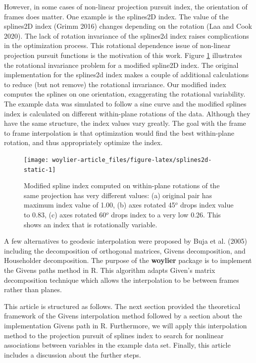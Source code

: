 However, in some cases of non-linear projection pursuit index, the orientation of frames does matter. One example is the splines2D index. The value of the splines2D index (Grimm 2016) changes depending on the rotation (Laa and Cook 2020). The lack of rotation invariance of the splines2d index raises complications in the optimization process. This rotational dependence issue of non-linear projection pursuit functions is the motivation of this work. Figure \ref{fig:splines2d-static} illustrates the rotational invariance problem for a modified spline2D index. The original implementation for the splines2d index makes a couple of additional calculations to reduce (but not remove) the rotational invariance. Our modified index computes the splines on one orientation, exaggerating the rotational variability. The example data was simulated to follow a sine curve and the modified splines index is calculated on different within-plane rotations of the data. Although they have the same structure, the index values vary greatly. The goal with the frame to frame interpolation is that optimization would find the best within-plane rotation, and thus appropriately optimize the index.

\begin{figure}
\texttt{[image: woylier-article\_files/figure-latex/splines2d-static-1]} \caption{Modified spline index computed on within-plane rotations of the same projection has very different values: (a) original pair has maximum index value of 1.00, (b) axes rotated 45$^o$ drops index value to 0.83, (c) axes rotated 60$^o$ drops index to a very low 0.26. This shows an index that is rotationally variable.}\label{fig:splines2d-static}
\end{figure}

A few alternatives to geodesic interpolation were proposed by Buja et al. (2005) including the decomposition of orthogonal matrices, Givens decomposition, and Householder decomposition. The purpose of the \textbf{woylier} package is to implement the Givens paths method in R. This algorithm adapts Given's matrix decomposition technique which allows the interpolation to be between frames rather than planes.

This article is structured as follows. The next section provided the theoretical framework of the Givens interpolation method followed by a section about the implementation Givens path in R. Furthermore, we will apply this interpolation method to the projection pursuit of splines index to search for nonlinear associations between variables in the example data set. Finally, this article includes a discussion about the further steps.

